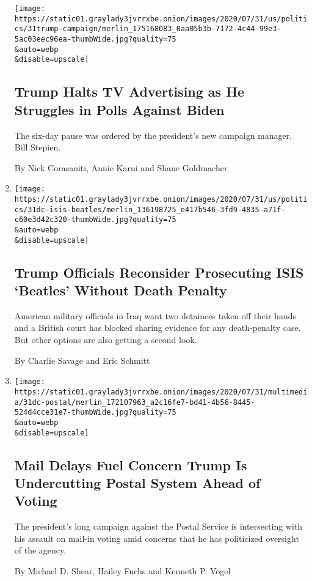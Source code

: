 \begin{enumerate}
  \texttt{[image: https://static01.graylady3jvrrxbe.onion/images/2020/07/31/us/politics/31trump-campaign/merlin\_175168083\_0aa05b3b-7172-4c44-99e3-5ac03eec96ea-thumbWide.jpg?quality=75\\\&auto=webp\\\&disable=upscale]}

  \hypertarget{trump-halts-tv-advertising-as-he-struggles-in-polls-against-biden}{%
  \subsection{Trump Halts TV Advertising as He Struggles in Polls
  Against
  Biden}\label{trump-halts-tv-advertising-as-he-struggles-in-polls-against-biden}}

  The six-day pause was ordered by the president's new campaign manager,
  Bill Stepien.

  By Nick Corasaniti, Annie Karni and Shane Goldmacher
\item
  \href{/2020/07/31/world/middleeast/isis-beatles-hostages.html}{}

  \texttt{[image: https://static01.graylady3jvrrxbe.onion/images/2020/07/31/us/politics/31dc-isis-beatles/merlin\_136198725\_e417b546-3fd9-4835-a71f-c60e3d42c320-thumbWide.jpg?quality=75\\\&auto=webp\\\&disable=upscale]}

  \hypertarget{trump-officials-reconsider-prosecuting-isis-beatles-without-death-penalty}{%
  \subsection{Trump Officials Reconsider Prosecuting ISIS `Beatles'
  Without Death
  Penalty}\label{trump-officials-reconsider-prosecuting-isis-beatles-without-death-penalty}}

  American military officials in Iraq want two detainees taken off their
  hands and a British court has blocked sharing evidence for any
  death-penalty case. But other options are also getting a second look.

  By Charlie Savage and Eric Schmitt
\item
  \href{/2020/07/31/us/politics/trump-usps-mail-delays.html}{}

  \texttt{[image: https://static01.graylady3jvrrxbe.onion/images/2020/07/31/multimedia/31dc-postal/merlin\_172107963\_a2c16fe7-bd41-4b56-8445-524d4cce31e7-thumbWide.jpg?quality=75\\\&auto=webp\\\&disable=upscale]}

  \hypertarget{mail-delays-fuel-concern-trump-is-undercutting-postal-system-ahead-of-voting}{%
  \subsection{Mail Delays Fuel Concern Trump Is Undercutting Postal
  System Ahead of
  Voting}\label{mail-delays-fuel-concern-trump-is-undercutting-postal-system-ahead-of-voting}}

  The president's long campaign against the Postal Service is
  intersecting with his assault on mail-in voting amid concerns that he
  has politicized oversight of the agency.

  By Michael D. Shear, Hailey Fuchs and Kenneth P. Vogel
\end{enumerate}

